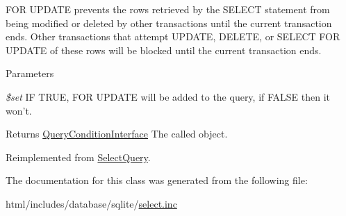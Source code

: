 FOR UPDATE prevents the rows retrieved by the SELECT statement from being modified or deleted by other transactions until the current transaction ends. Other transactions that attempt UPDATE, DELETE, or SELECT FOR UPDATE of these rows will be blocked until the current transaction ends.


\begin{DoxyParams}{Parameters}
\item[{\em \$set}]IF TRUE, FOR UPDATE will be added to the query, if FALSE then it won't.\end{DoxyParams}
\begin{DoxyReturn}{Returns}
\hyperlink{interfaceQueryConditionInterface}{QueryConditionInterface} The called object. 
\end{DoxyReturn}


Reimplemented from \hyperlink{classSelectQuery_a44a1776379e738445712e196957e02b4}{SelectQuery}.

The documentation for this class was generated from the following file:\begin{DoxyCompactItemize}
\item 
html/includes/database/sqlite/\hyperlink{sqlite_2select_8inc}{select.inc}\end{DoxyCompactItemize}
